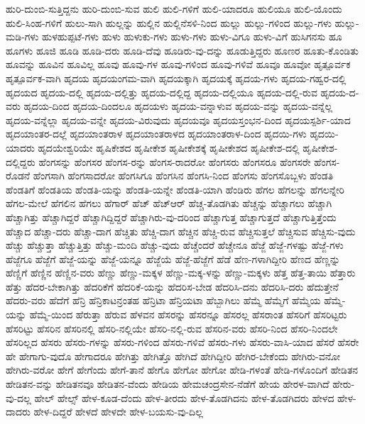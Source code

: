 {ಹುರಿ-ದುಂಬಿ-ಸುತ್ತಿದ್ದನು
ಹುರಿ-ದುಂಬಿ-ಸುವ
ಹುಲಿ
ಹುಲಿ-ಗಳಿಗೆ
ಹುಲಿ-ಯಾದರೂ
ಹುಲಿಯೂ
ಹುಲಿ-ಯೊಂದು
ಹುಲಿ-ಸಿಂಹ-ಗಳಿಗೆ
ಹುಲು-ಸಾಗಿ
ಹುಲ್ಲನ್ನು
ಹುಲ್ಲಿನ
ಹುಲ್ಲಿನೆಸಳಿ-ನಿಂದ
ಹುಲ್ಲು
ಹುಲ್ಲು-ಗಳಿಂದ
ಹುಲ್ಲು-ಗಳು
ಹುಲ್ಲು-ಮಡಿ-ಗಳು
ಹುಳಹುಪ್ಪಟೆ-ಗಳು
ಹುಳು
ಹುಳುಕು-ಗಳು
ಹುಳು-ಗಳು
ಹುಳು-ವಿಗೂ
ಹುಳು-ವಿಗೆ
ಹುಸಿಗನಸು
ಹೂ
ಹೂಗಳು
ಹೂಜಿ
ಹೂಡಿ
ಹೂಡಿ-ದರು
ಹೂಡಿ-ದೆವು
ಹೂಡಿರು-ವು-ದನ್ನು
ಹೂಡುತ್ತಿದ್ದರು
ಹೂಣರ
ಹೂತು-ಕೊಂಡಿತು
ಹೂವನ್ನು
ಹೂವಿನ
ಹೂವಿಲ್ಲ
ಹೂವು
ಹೂವು-ಗಳ
ಹೂವು-ಗಳಿಂದ
ಹೂವು-ಗಳಿವೆ
ಹೂವೂ
ಹೂವೋ
ಹೃತ್ಪೂರ್ವಕ
ಹೃತ್ಪೂರ್ವಕ-ವಾಗಿ
ಹೃದಯ
ಹೃದಯಂಗಮ-ವಾಗಿ
ಹೃದಯಕ್ಕಾಗಿ
ಹೃದಯಕ್ಕೆ
ಹೃದಯ-ಗಳು
ಹೃದಯ-ಗಹ್ವರ-ದಲ್ಲಿ
ಹೃದಯದ
ಹೃದಯ-ದಲ್ಲಿ
ಹೃದಯ-ದಲ್ಲಿತ್ತು
ಹೃದಯ-ದಲ್ಲಿದ್ದ
ಹೃದಯ-ದಲ್ಲಿಯೂ
ಹೃದಯ-ದಲ್ಲಿ-ರುವ
ಹೃದಯ-ದ-ವರು
ಹೃದಯ-ದಿಂದ
ಹೃದಯ-ದಿಂದಲೂ
ಹೃದಯಳು
ಹೃದಯ-ವನ್ನಾಳುವ
ಹೃದಯ-ವನ್ನು
ಹೃದಯ-ವನ್ನೆಲ್ಲ
ಹೃದಯ-ವನ್ನೆಲ್ಲಾ
ಹೃದಯ-ವನ್ನೇ
ಹೃದಯ-ವಿರುವುದು
ಹೃದಯವೂ
ಹೃದಯಸ್ತಂಭನ-ದಿಂದ
ಹೃದಯಸ್ಪರ್ಶಿ-ಯಾದ
ಹೃದಯಾಂತರ-ದಲ್ಲೆ
ಹೃದಯಾಂತರಾಳ
ಹೃದಯಾಂತರಾಳದ
ಹೃದಯಾಂತರಾಳ-ದಿಂದ
ಹೃದಯಿ-ಗಳು
ಹೃದಯಿ-ಯಾದರು
ಹೃದಯೇಶ್ವರಿಯೇ
ಹೃಷಿಕೇಶದ
ಹೃಷೀಕೇಶ
ಹೃಷೀಕೇಶಕ್ಕೆ
ಹೃಷೀಕೇಶದ
ಹೃಷೀಕೇಶ-ದಲ್ಲಿ
ಹೃಷೀಕೇಶ-ದಲ್ಲಿದ್ದರು
ಹೆಂಗಸನ್ನು
ಹೆಂಗಸರ
ಹೆಂಗಸ-ರನ್ನು
ಹೆಂಗಸ-ರಾದರೋ
ಹೆಂಗಸರು
ಹೆಂಗಸರೂ
ಹೆಂಗಸರೇ
ಹೆಂಗಸ-ರೊಡನೆ
ಹೆಂಗಸಾಗಿ
ಹೆಂಗಸಾದರೋ
ಹೆಂಗಸಿಗೂ
ಹೆಂಗಸಿನ
ಹೆಂಗಸಿ-ನಿಂದ
ಹೆಂಗಸು
ಹೆಂಗಸೊಬ್ಬಳು
ಹೆಂಡತಿ
ಹೆಂಡತಿಗೆ
ಹೆಂಡತಿಯ
ಹೆಂಡತಿ-ಯನ್ನು
ಹೆಂಡತಿ-ಯನ್ನೇ
ಹೆಂಡತಿ-ಯಾಗಿ
ಹೆಂಡಿರು
ಹೆಗಲ
ಹೆಗಲನ್ನು
ಹೆಗಲನ್ನೇರಿ
ಹೆಗಲ-ಮೇಲೆ
ಹೆಗಲಿನ
ಹೆಗಲು
ಹೆಗಾರ್
ಹೆಚ್
ಹೆಚ್ಆರ್
ಹೆಚ್ಚ-ತೊಡಗಿತು
ಹೆಚ್ಚನ್ನು
ಹೆಚ್ಚಾಗಲು
ಹೆಚ್ಚಾಗಿ
ಹೆಚ್ಚಾಗಿತ್ತು
ಹೆಚ್ಚಾಗಿದ್ದರೆ
ಹೆಚ್ಚಾಗಿದ್ದಿದ್ದರೆ
ಹೆಚ್ಚಾಗಿರು-ವು-ದರಿಂದ
ಹೆಚ್ಚಾಗುತ್ತ
ಹೆಚ್ಚಾಗುತ್ತದೆ
ಹೆಚ್ಚಾಗುತ್ತಿತ್ತೆಂದು
ಹೆಚ್ಚಾದ
ಹೆಚ್ಚಾ-ದರು
ಹೆಚ್ಚಾ-ದಾಗ
ಹೆಚ್ಚಿತು
ಹೆಚ್ಚಿ-ದಾಗ
ಹೆಚ್ಚಿನ
ಹೆಚ್ಚಿ-ರುವ
ಹೆಚ್ಚಿಸುತ್ತಲೆ
ಹೆಚ್ಚಿಸುವ
ಹೆಚ್ಚಿಸು-ವುದು
ಹೆಚ್ಚು
ಹೆಚ್ಚುತ್ತಾ
ಹೆಚ್ಚುತ್ತಿತ್ತು
ಹೆಚ್ಚು-ಮಂದಿ
ಹೆಚ್ಚು-ವುದು
ಹೆಚ್ಚೆಂದರೆ
ಹೆಚ್ಚೇನೂ
ಹೆಜ್ಜೆ
ಹೆಜ್ಜೆ-ಗಳಷ್ಟು
ಹೆಜ್ಜೆ-ಗಳು
ಹೆಜ್ಜೆಗೂ
ಹೆಜ್ಜೆಗೆ
ಹೆಜ್ಜೆ-ಯನ್ನು
ಹೆಜ್ಜೆ-ಯನ್ನೂ
ಹೆಜ್ಜೆಯೆ
ಹೆಜ್ಜೆ-ಹೆಜ್ಜೆಗೆ
ಹೆಡೆ
ಹೆಣ-ಗಳಾಗಿದ್ದೀರಿ
ಹೆಣದ
ಹೆಣ್ಣನ್ನು
ಹೆಣ್ಣಿಗೆ
ಹೆಣ್ಣಿನ
ಹೆಣ್ಣಿನ-ವರು
ಹೆಣ್ಣು
ಹೆಣ್ಣು-ಮಕ್ಕಳ
ಹೆಣ್ಣು-ಮಕ್ಕ-ಳನ್ನು
ಹೆಣ್ಣು-ಮಕ್ಕಳು
ಹೆತ್ತ
ಹೆತ್ತ-ತಾಯಿ
ಹೆತ್ತಾರು
ಹೆತ್ತು
ಹೆದರ-ಬೇಕಾಗಿತ್ತು
ಹೆದರಿಕೆಗೆ
ಹೆದರಿಕೆ-ಯನ್ನು
ಹೆದರಿಸ-ಬೇಡ
ಹೆದರಿಸಿ-ದನು
ಹೆದರಿಸಿ-ದರು
ಹೆದುತ್ತೇನೆ
ಹೆದರು-ವರು
ಹೆದೆಗೆ
ಹೆನ್ರಿ
ಹೆನ್ರಿಕಾಟನ್ರಂತಹ
ಹೆನ್ರಿಟಾ
ಹೆನ್ರಿಯಟಾ
ಹೆಬ್ಬಾಗಿಲು
ಹೆಮ್ಮೆ
ಹೆಮ್ಮೆಗೆ
ಹೆಮ್ಮೆಯ
ಹೆಮ್ಮೆ-ಯನ್ನು
ಹೆಮ್ಮೆ-ಯಿಂದ
ಹೆರುತ್ತಾ
ಹೆರುವ
ಹೆಳವನ
ಹೆಸರನ್ನು
ಹೆಸರನ್ನೂ
ಹೆಸರಲ್ಲ
ಹೆಸರಾಂತ
ಹೆಸರಿಗೆ
ಹೆಸರಿಟ್ಟರು
ಹೆಸರಿಟ್ಟು
ಹೆಸರಿನ
ಹೆಸರಿನಲ್ಲಿ
ಹೆಸರಿ-ನಲ್ಲಿಯೇ
ಹೆಸರಿ-ನಲ್ಲಿ-ರುವ
ಹೆಸರಿನ-ವರು
ಹೆಸರಿ-ನಿಂದ
ಹೆಸರಿ-ನಿಂದಲೇ
ಹೆಸರಿಲ್ಲದ
ಹೆಸರು
ಹೆಸರು-ಗಳನ್ನು
ಹೆಸರು-ಗಳಿಂದ
ಹೆಸರು-ಗಳಿವೆ
ಹೆಸರು-ಗಳು
ಹೆಸರು-ವಾಸಿ-ಯಾದ
ಹೆಸರೆ
ಹೆಸರೇ
ಹೇ
ಹೇಗಾಗು-ವುದೊ
ಹೇಗಾದರೂ
ಹೇಗಿತ್ತು
ಹೇಗಿತ್ತೊ
ಹೇಗಿದೆ
ಹೇಗಿದ್ದೀರಿ
ಹೇಗಿರ-ಬೇಕೆಂದು
ಹೇಗಿರು-ವನೋ
ಹೇಗಿರು-ವರೋ
ಹೇಗೆ
ಹೇಗೆಂದು
ಹೇಗೆ-ತಾನೆ
ಹೇಗೊ
ಹೇಗೋ
ಹೇಗೋ
ಹೇಡಿ-ಗಳಂತೆ
ಹೇಡಿ-ಗಳೊಂದಿಗೆ
ಹೇಡಿತನ
ಹೇಡಿತನ-ವನ್ನು
ಹೇಡಿತನವೂ
ಹೇಡಿತನ-ವೆಂದು
ಹೇಡಿಯ
ಹೇಮಚಂದ್ರಸೇನ-ನೆಡೆಗೆ
ಹೇಯ
ಹೇರಳ-ವಾಗಿದೆ
ಹೇರು-ವು-ದಲ್ಲ
ಹೇಲ್
ಹೇಲ್ಸ್
ಹೇಳ-ಕೂಡ-ದೆಂದು
ಹೇಳ-ತೀರದು
ಹೇಳ-ತೊಡಗಿದನು
ಹೇಳ-ತೊಡಗಿದರು
ಹೇಳದ
ಹೇಳ-ದಾದರು
ಹೇಳ-ದಿದ್ದರೆ
ಹೇಳದೆ
ಹೇಳದೇ
ಹೇಳ-ಬಯಸು-ವು-ದಿಲ್ಲ
}
